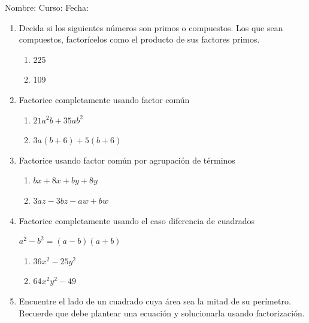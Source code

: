 \documentclass[letterpaper,fleqn]{article}
\newcommand{\LineaNombre}{%
\par
\vspace{\baselineskip}
Nombre:\hrulefill \; Curso: \underline{\hspace*{48pt}} \; Fecha: \underline{\hspace*{2.5cm}} \relax
\par}
\begin{document}
\LineaNombre
\begin{enumerate}
 \item Decida si los siguientes números son primos o compuestos. Los que sean compuestos, factorícelos como el producto de sus factores primos.
 \begin{enumerate}
 \item 225\noanswer
 \item 109 \noanswer
 \end{enumerate}
 \item Factorice completamente usando factor común
 \begin{enumerate}
 \item $21a^{2}b+35ab^{2}$\noanswer
 \item $3a(b+6)+5(b+6)$\noanswer
 \end{enumerate}
 \item Factorice usando factor común por agrupación de términos
 \begin{enumerate}
 \item $bx+8x+by+8y$\noanswer
 \newpage
 \item $3az-3bz-aw+bw$\noanswer
 \end{enumerate}
 \item Factorice completamente usando el caso diferencia de cuadrados
  \begin{center}
  $a^{2}-b^{2}=(a-b)(a+b)$
  \end{center}
\begin{enumerate}
\item $36x^{2}-25y^{2}$\noanswer
\item $64x^{2}y^{2}-49$\noanswer
\end{enumerate}
\item Encuentre el lado de un cuadrado cuya área sea la mitad de su perímetro. Recuerde que debe plantear una ecuación y solucionarla usando factorización.\noanswer
 \end{enumerate}
\end{document}
